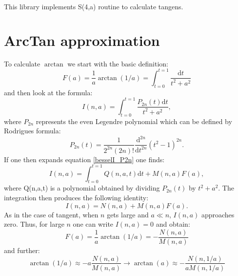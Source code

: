 \documentclass[openany, longbibliography,slovene,a4paper,12pt]{article}
\newcommand{\dif}{\mathrm{d}}
\begin{document}
This library implements S(4,a) routine to calculate tangens.

\section{ArcTan approximation}
To calculate $\arctan$ we start with the basic definition:
\begin{equation}
  F(a)=\frac{1}{a}\arctan(1/a)=\int_{t=0}^{t=1}\frac{\dif t}{t^2+a^2}
  \end{equation}
  and then look at the formula:
  \begin{equation} \label{besselI_P2n}
    I(n,a)=\int_{t=0}^{t=1}\frac{P_{2n}(t)\dif t}{t^2+a^2},
  \end{equation}
  where $P_{2n}$ represents the even Legendre polynomial which can be defined by
  Rodrigues formula:
  \begin{equation}
    P_{2n}(t)=\frac{1}{2^{2n}(2n)!}\frac{\dif^{2n}}{\dif t^{2n}}(t^2-1)^{2n}.
  \end{equation}
  If one then expands equation \ref{besselI_P2n} one finds:
  \begin{equation}
    I(n,a)=\int_{t=0}^{t=1}Q(n,a,t)\dif t+ M(n,a)F(a),
  \end{equation}
  where Q(n,a,t) is a polynomial obtained by dividing $P_{2n}(t)$ by $t^2+a^2$.
  The integration then produces the following identity:
  \begin{equation}
    I(n,a)=N(n,a)+M(n,a)F(a).
  \end{equation}
  As in the case of tangent, when $n$ gets large and $a \ll n$, $I(n,a)$
  approaches zero. Thus, for large $n$ one can write $I(n,a)=0$ and obtain:
  \begin{equation}
    F(a)=\frac{1}{a}\arctan(1/a)=-\frac{N(n,a)}{M(n,a)}
    \end{equation}
    and further:
    \begin{equation}
      \arctan(1/a)\approx -a\frac{N(n,a)}{M(n,a)} \rightarrow  \arctan(a)\approx -\frac{N(n,1/a)}{aM(n,1/a)}
      \end{equation}
  
\end{document}
